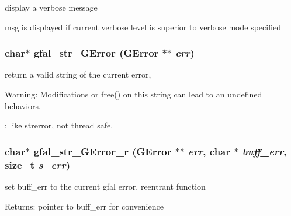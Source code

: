 display a verbose message 

msg is displayed if current verbose level is superior to verbose mode specified 
\subsubsection{\setlength{\rightskip}{0pt plus 5cm}char$\ast$ gfal\_\-str\_\-GError (GError $\ast$$\ast$ {\em err})}\label{gfal__common__errverbose_8c_c35c45ff43533cc6e7c176b0fa0b3128}


return a valid string of the current error, \begin{Desc}
\item[Warning:]Modifications or free() on this string can lead to an undefined behaviors. 

: like strerror, not thread safe. \end{Desc}
\subsubsection{\setlength{\rightskip}{0pt plus 5cm}char$\ast$ gfal\_\-str\_\-GError\_\-r (GError $\ast$$\ast$ {\em err}, char $\ast$ {\em buff\_\-err}, size\_\-t {\em s\_\-err})}\label{gfal__common__errverbose_8c_4dec12f0df920db39c004776d7f04e6e}


set buff\_\-err to the current gfal error, reentrant function \begin{Desc}
\item[Returns:]pointer to buff\_\-err for convenience \end{Desc}
